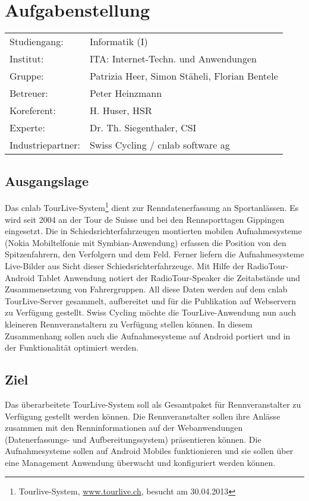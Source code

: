 \chapter*{Aufgabenstellung}

\begin{tabular}{ll}
	Studiengang: & Informatik (I) \\
	Institut: & ITA: Internet-Techn. und Anwendungen \\
	Gruppe: & Patrizia Heer, Simon Stäheli, Florian Bentele \\
	Betreuer: & Peter Heinzmann  \\
	Koreferent: & H. Huser, HSR \\
	Experte: & Dr. Th. Siegenthaler, CSI  \\
	Industriepartner: & Swiss Cycling / cnlab software ag \\    
   
\end{tabular}
\section*{Ausgangslage}
Das cnlab TourLive-System\footnote{Tourlive-System, \url{www.tourlive.ch}, besucht am 30.04.2013} dient zur Renndatenerfassung an Sportanlässen. Es wird seit 2004 an der Tour de Suisse und bei den Rennsporttagen Gippingen eingesetzt. Die in Schiedsrichterfahrzeugen montierten mobilen Aufnahmesysteme (Nokia Mobiltelfonie mit Symbian-Anwendung) erfassen die Position von den Spitzenfahrern, den Verfolgern und dem Feld. Ferner liefern die Aufnahmesysteme Live-Bilder aus Sicht dieser Schiedsrichterfahrzeuge. Mit Hilfe der RadioTour-Android Tablet Anwendung notiert der RadioTour-Speaker die Zeitabstände und Zusammensetzung von Fahrergruppen. All diese Daten werden auf dem cnlab TourLive-Server gesammelt, aufbereitet und für die Publikation auf Webservern zu Verfügung gestellt. 
Swiss Cycling möchte die TourLive-Anwendung nun auch kleineren Rennveranstaltern zu Verfügung stellen können. In diesem Zusammenhang sollen auch die Aufnahmesysteme auf Android portiert und in der Funktionalität optimiert werden.

\section*{Ziel}
Das überarbeitete TourLive-System soll als Gesamtpaket für Rennveranstalter zu Verfügung gestellt werden können. Die Rennveranstalter sollen ihre Anlässe zusammen mit den Renninformationen auf der Webanwendungen (Datenerfassungs- und Aufbereitungssystem) präsentieren können. Die Aufnahmesysteme sollen auf Android Mobiles funktionieren und sie sollen über eine Management Anwendung überwacht und konfiguriert werden können.

